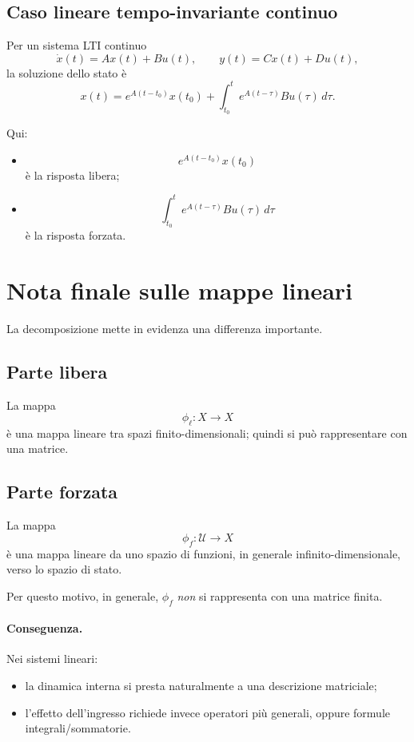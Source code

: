 \subsection{Caso lineare tempo-invariante continuo}

Per un sistema LTI continuo
\[
\dot x(t)=Ax(t)+Bu(t),
\qquad
y(t)=Cx(t)+Du(t),
\]
la soluzione dello stato è
\[
x(t)=e^{A(t-t_0)}x(t_0)+\int_{t_0}^{t} e^{A(t-\tau)}Bu(\tau)\,d\tau.
\]

Qui:
\begin{itemize}
    \item
    \[
    e^{A(t-t_0)}x(t_0)
    \]
    è la risposta libera;
    \item
    \[
    \int_{t_0}^{t} e^{A(t-\tau)}Bu(\tau)\,d\tau
    \]
    è la risposta forzata.
\end{itemize}

\section{Nota finale sulle mappe lineari}

La decomposizione mette in evidenza una differenza importante.

\subsection{Parte libera}

La mappa
\[
\phi_\ell: X\to X
\]
è una mappa lineare tra spazi finito-dimensionali; quindi si può rappresentare con una matrice.

\subsection{Parte forzata}

La mappa
\[
\phi_f:\mathcal{U}\to X
\]
è una mappa lineare da uno spazio di funzioni, in generale infinito-dimensionale, verso lo spazio di stato.

Per questo motivo, in generale, $\phi_f$ \emph{non} si rappresenta con una matrice finita.

\paragraph{Conseguenza.}
Nei sistemi lineari:
\begin{itemize}
    \item la dinamica interna si presta naturalmente a una descrizione matriciale;
    \item l'effetto dell'ingresso richiede invece operatori più generali, oppure formule integrali/sommatorie.
\end{itemize}

